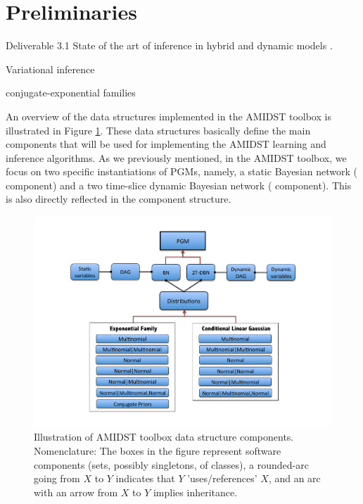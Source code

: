 \section{Preliminaries} \label{Preliminaries} 

Deliverable 3.1 State of the art of inference in hybrid and dynamic models \cite{Deliverable 3.1}.

Variational inference  \cite{Jordan1999,Attias2000}

conjugate-exponential families \cite{Attias2000,Beal2003,Bishop2005}

An overview of the data structures implemented in the AMIDST toolbox is illustrated in Figure \ref{Figure:ToolboxDataStructures}. These data structures basically define the main components that will be used for implementing the AMIDST learning and inference algorithms. As we previously mentioned, in the AMIDST toolbox, we focus on two specific instantiations of PGMs, namely, a static Bayesian network ( component) and a two time-slice dynamic Bayesian network ( component). This is also directly reflected in the component structure.

\vspace{-0.1in}

\begin{figure}[ht!]
\begin{center}
\includegraphics[width=\linewidth]{./figures/DataStructure}
\vspace{-0.5in}
\caption{\label{Figure:ToolboxDataStructures} Illustration of AMIDST toolbox data structure components. Nomenclature: The boxes in the
      figure represent software components (sets, possibly singletons, of classes), a rounded-arc going from $X$ to $Y$ indicates that $Y$ 'uses/references' $X$, and an arc with an arrow from $X$ to $Y$ implies inheritance.}
\end{center}
\end{figure}